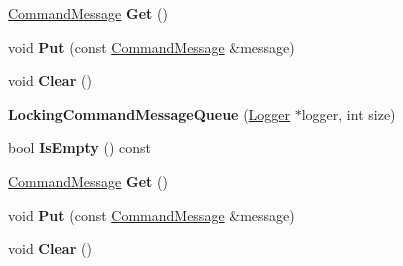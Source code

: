 \begin{DoxyCompactItemize}
\item 
\hypertarget{classv8_1_1internal_1_1_b_a_s_e___e_m_b_e_d_d_e_d_a5069d6fc426f8f9f4c45ace57895ae77}{}\hyperlink{classv8_1_1internal_1_1_command_message}{Command\+Message} {\bfseries Get} ()\label{classv8_1_1internal_1_1_b_a_s_e___e_m_b_e_d_d_e_d_a5069d6fc426f8f9f4c45ace57895ae77}

\item 
\hypertarget{classv8_1_1internal_1_1_b_a_s_e___e_m_b_e_d_d_e_d_a84bd59f322257d07c738da8ba6c5fdc5}{}void {\bfseries Put} (const \hyperlink{classv8_1_1internal_1_1_command_message}{Command\+Message} \&message)\label{classv8_1_1internal_1_1_b_a_s_e___e_m_b_e_d_d_e_d_a84bd59f322257d07c738da8ba6c5fdc5}

\item 
\hypertarget{classv8_1_1internal_1_1_b_a_s_e___e_m_b_e_d_d_e_d_ac459434b795d52e3e98af829a58254ab}{}void {\bfseries Clear} ()\label{classv8_1_1internal_1_1_b_a_s_e___e_m_b_e_d_d_e_d_ac459434b795d52e3e98af829a58254ab}

\item 
\hypertarget{classv8_1_1internal_1_1_b_a_s_e___e_m_b_e_d_d_e_d_a8e8a936f231dbb9c45662a6045eb8ddb}{}{\bfseries Locking\+Command\+Message\+Queue} (\hyperlink{classv8_1_1internal_1_1_logger}{Logger} $\ast$logger, int size)\label{classv8_1_1internal_1_1_b_a_s_e___e_m_b_e_d_d_e_d_a8e8a936f231dbb9c45662a6045eb8ddb}

\item 
\hypertarget{classv8_1_1internal_1_1_b_a_s_e___e_m_b_e_d_d_e_d_a73fac08bafbeb8e39059e17d4e7db0b7}{}bool {\bfseries Is\+Empty} () const \label{classv8_1_1internal_1_1_b_a_s_e___e_m_b_e_d_d_e_d_a73fac08bafbeb8e39059e17d4e7db0b7}

\item 
\hypertarget{classv8_1_1internal_1_1_b_a_s_e___e_m_b_e_d_d_e_d_a5069d6fc426f8f9f4c45ace57895ae77}{}\hyperlink{classv8_1_1internal_1_1_command_message}{Command\+Message} {\bfseries Get} ()\label{classv8_1_1internal_1_1_b_a_s_e___e_m_b_e_d_d_e_d_a5069d6fc426f8f9f4c45ace57895ae77}

\item 
\hypertarget{classv8_1_1internal_1_1_b_a_s_e___e_m_b_e_d_d_e_d_a84bd59f322257d07c738da8ba6c5fdc5}{}void {\bfseries Put} (const \hyperlink{classv8_1_1internal_1_1_command_message}{Command\+Message} \&message)\label{classv8_1_1internal_1_1_b_a_s_e___e_m_b_e_d_d_e_d_a84bd59f322257d07c738da8ba6c5fdc5}

\item 
\hypertarget{classv8_1_1internal_1_1_b_a_s_e___e_m_b_e_d_d_e_d_ac459434b795d52e3e98af829a58254ab}{}void {\bfseries Clear} ()\label{classv8_1_1internal_1_1_b_a_s_e___e_m_b_e_d_d_e_d_ac459434b795d52e3e98af829a58254ab}


\end{DoxyCompactItemize}
